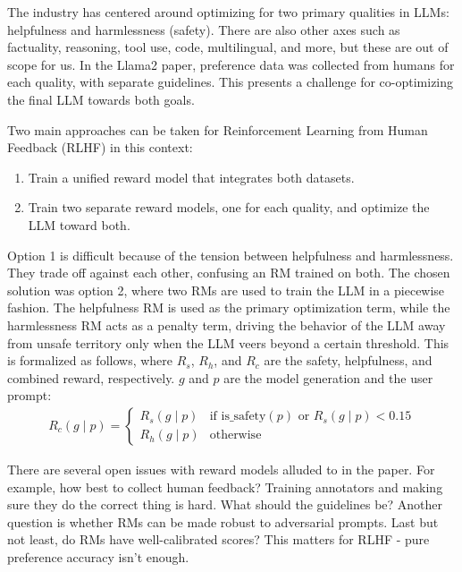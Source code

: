 \documentclass[
  letterpaper,
  DIV=11,
  numbers=noendperiod,
  oneside]{scrreprt}
\theoremstyle{remark}
\begin{document}
The industry has centered around optimizing for two primary qualities in
LLMs: helpfulness and harmlessness (safety). There are also other axes
such as factuality, reasoning, tool use, code, multilingual, and more,
but these are out of scope for us. In the Llama2 paper, preference data
was collected from humans for each quality, with separate guidelines.
This presents a challenge for co-optimizing the final LLM towards both
goals.

Two main approaches can be taken for Reinforcement Learning from Human
Feedback (RLHF) in this context:

\begin{enumerate}
\def\labelenumi{\arabic{enumi}.}
\item
  Train a unified reward model that integrates both datasets.
\item
  Train two separate reward models, one for each quality, and optimize
  the LLM toward both.
\end{enumerate}

Option 1 is difficult because of the tension between helpfulness and
harmlessness. They trade off against each other, confusing an RM trained
on both. The chosen solution was option 2, where two RMs are used to
train the LLM in a piecewise fashion. The helpfulness RM is used as the
primary optimization term, while the harmlessness RM acts as a penalty
term, driving the behavior of the LLM away from unsafe territory only
when the LLM veers beyond a certain threshold. This is formalized as
follows, where \(R_s\), \(R_h\), and \(R_c\) are the safety,
helpfulness, and combined reward, respectively. \(g\) and \(p\) are the
model generation and the user prompt: \[\begin{aligned}
    R_c(g \mid p) =
    \begin{cases}
        R_s(g \mid p) & \text{if } \text{is\_safety}(p) \text{ or } R_s(g \mid p) < 0.15 \\
        R_h(g \mid p) & \text{otherwise}
    \end{cases}
\end{aligned}\]

There are several open issues with reward models alluded to in the
paper. For example, how best to collect human feedback? Training
annotators and making sure they do the correct thing is hard. What
should the guidelines be? Another question is whether RMs can be made
robust to adversarial prompts. Last but not least, do RMs have
well-calibrated scores? This matters for RLHF - pure preference accuracy
isn't enough.
\end{document}
